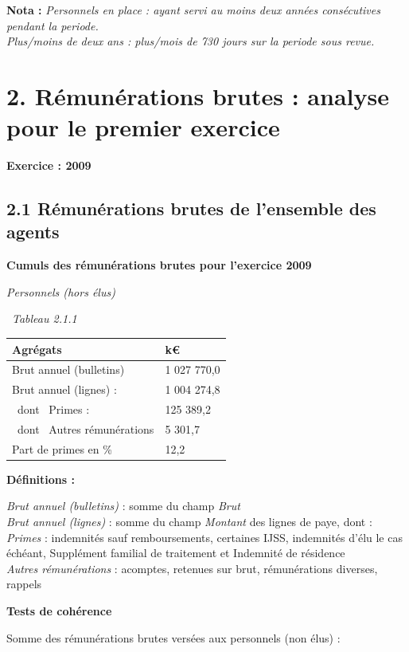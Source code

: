 \textbf{Nota :} \emph{Personnels en place : ayant servi au moins deux
années consécutives pendant la periode.}\\
\emph{Plus/moins de deux ans : plus/mois de 730 jours sur la periode
sous revue.}

\hypertarget{remunerations-brutes-analyse-pour-le-premier-exercice}{%
\section{2. Rémunérations brutes : analyse pour le premier
exercice}\label{remunerations-brutes-analyse-pour-le-premier-exercice}}

\textbf{Exercice : 2009 }

\hypertarget{remunerations-brutes-de-lensemble-des-agents}{%
\subsection{2.1 Rémunérations brutes de l'ensemble des
agents}\label{remunerations-brutes-de-lensemble-des-agents}}

\textbf{Cumuls des rémunérations brutes pour l'exercice 2009 }

\emph{Personnels (hors élus)}

~\emph{Tableau 2.1.1}

\begin{longtable}[]{@{}ll@{}}
\toprule
Agrégats & k€\tabularnewline
\midrule
\endhead
Brut annuel (bulletins) & 1 027 770,0\tabularnewline
Brut annuel (lignes) : & 1 004 274,8\tabularnewline
~dont ~Primes : & 125 389,2\tabularnewline
~dont ~Autres rémunérations & 5 301,7\tabularnewline
Part de primes en \% & 12,2\tabularnewline
\bottomrule
\end{longtable}

\textbf{Définitions :}

\emph{Brut annuel (bulletins)} : somme du champ \emph{Brut}\\
\emph{Brut annuel (lignes)} : somme du champ \emph{Montant} des lignes
de paye, dont :\\
\emph{Primes} : indemnités sauf remboursements, certaines IJSS,
indemnités d'élu le cas échéant, Supplément familial de traitement et
Indemnité de résidence\\
\emph{Autres rémunérations} : acomptes, retenues sur brut, rémunérations
diverses, rappels

\textbf{Tests de cohérence}

Somme des rémunérations brutes versées aux personnels (non élus) :

